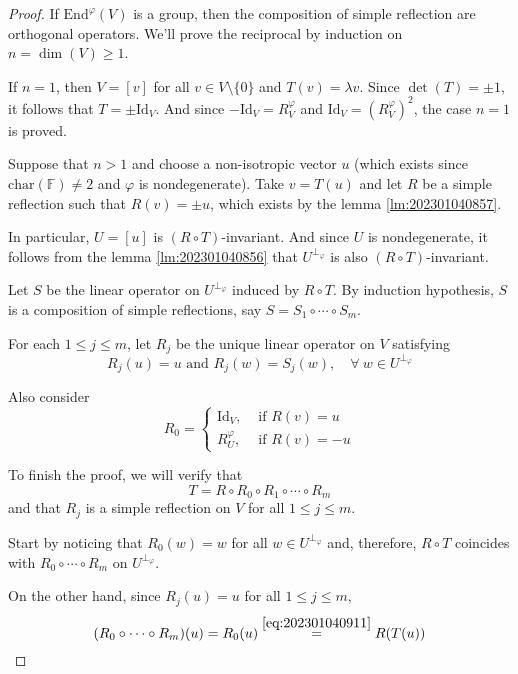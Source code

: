 \begin{proof}
  If $\text{End}^\varphi(V)$ is a group, then the composition of simple reflection are orthogonal operators. We'll prove the reciprocal by induction on $n = \dim(V) \geq 1$.

  If $n = 1$, then $V = [v]$ for all $v \in V \setminus \{ 0 \}$ and $T(v) = \lambda v$. Since $\det(T) = \pm 1$, it follows that $T = \pm \text{Id}_V$. And since $- \text{Id}_V = R_V^\varphi$ and $\text{Id}_V = (R_V^\varphi)^2$, the case $n = 1$ is proved. 

  Suppose that $n > 1$ and choose a non-isotropic vector $u$ (which exists since $\text{char}(\mathbb{F}) \neq 2$ and $\varphi$ is nondegenerate). Take $v = T(u)$ and let $R$ be a simple reflection such that $R(v) = \pm u$, which exists by the lemma \ref{lm:202301040857}.
  
  In particular, $U = [u]$ is $(R \circ T)$-invariant. And since $U$ is nondegenerate, it follows from the lemma \ref{lm:202301040856} that $U^{\perp_\varphi}$ is also $(R \circ T)$-invariant.

  Let $S$ be the linear operator on $U^{\perp_\varphi}$ induced by $R \circ T$. By induction hypothesis, $S$ is a composition of simple reflections, say $S = S_1 \circ \cdots \circ S_m$.

  For each $1 \leq j \leq m$, let $R_j$ be the unique linear operator on $V$ satisfying 
  \[
    R_j(u) = u \text{ and } R_j(w) = S_j(w), \quad \forall ~w \in U^{\perp_\varphi}
  \]

  Also consider 
  \begin{equation}\label{eq:202301040911}
    R_0 = \begin{cases}
      \text{Id}_V, & \text{ if } R(v) = u \\
      R_U^\varphi, & \text{ if } R(v) = -u
    \end{cases}
  \end{equation}

  To finish the proof, we will verify that 
  \begin{equation}\label{eq:202301040913}
    T = R \circ R_0 \circ R_1 \circ \cdots \circ R_m
  \end{equation}
  and that $R_j$ is a simple reflection on $V$ for all $1 \leq j \leq m$.

  Start by noticing that $R_0(w) = w$ for all $w \in U^{\perp_\varphi}$ and, therefore, $R \circ T$ coincides with $R_0 \circ \cdots \circ R_m$ on $U^{\perp_\varphi}$. 

  On the other hand, since $R_j(u) = u$ for all $1 \leq j \leq m$, 
  \[
    (R_0 \circ \cdots \circ R_m)(u) = R_0(u) \overset{\ref{eq:202301040911}}{=} R(T(u))
  \]


\end{proof}
